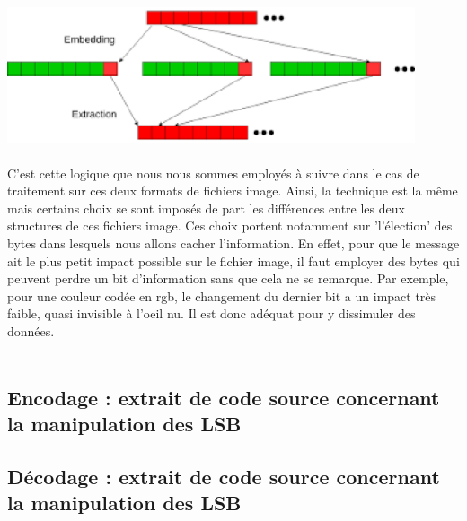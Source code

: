 \includegraphics[width=12cm]{lsb.eps}\\\\


C'est cette logique que nous nous sommes employés à suivre dans le cas de traitement sur ces deux formats de fichiers image.
Ainsi, la technique est la même mais certains choix se sont imposés de part les différences entre les deux structures de ces 
fichiers image. Ces choix portent notamment sur 'l'élection' des bytes dans lesquels nous allons cacher l'information.
En effet, pour que le message ait le plus petit impact possible sur le fichier image, il faut employer des bytes qui peuvent
perdre un bit d'information sans que cela ne se remarque.
Par exemple, pour une couleur codée en rgb, le changement du dernier bit a un impact très faible, quasi invisible à l'oeil nu.
Il est donc adéquat pour y dissimuler des données.\\\\


\subsection{Encodage : extrait de code source concernant la manipulation des LSB}


\subsection{Décodage : extrait de code source concernant la manipulation des LSB}


\vspace{1.5cm}

